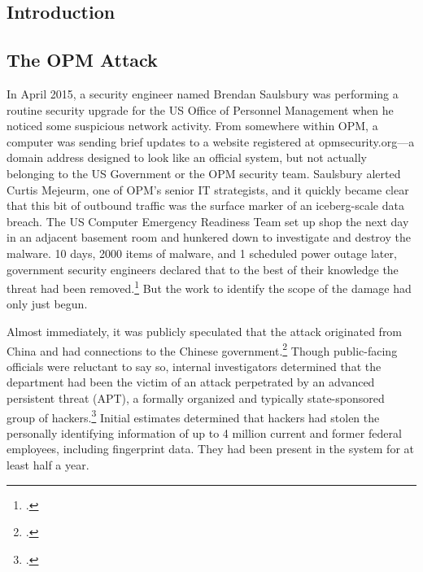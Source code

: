\documentclass{report}
\begin{document}
\begin{refsegment}

\section{Introduction}
\subsection{The OPM Attack}
In April 2015, a security engineer named Brendan Saulsbury was performing a routine security upgrade for the US Office of Personnel Management when he noticed some suspicious network activity. From somewhere within OPM, a computer was sending brief updates to a website registered at opmsecurity.org---a domain address designed to look like an official system, but not actually belonging to the US Government or the OPM security team. Saulsbury alerted Curtis Mejeurm, one of OPM's senior IT strategists, and it quickly became clear that this bit of outbound traffic was the surface marker of an iceberg-scale data breach. The US Computer Emergency Readiness Team set up shop the next day in an adjacent basement room and hunkered down to investigate and destroy the malware. 10 days, 2000 items of malware, and 1 scheduled power outage later, government security engineers declared that to the best of their knowledge the threat had been removed.\footcite{koerner_inside_2016} But the work to identify the scope of the damage had only just begun.

Almost immediately, it was publicly speculated that the attack originated from China and had connections to the Chinese government.\footcite{spetalnick_china_2015} Though public-facing officials were reluctant to say so, internal investigators determined that the department had been the victim of an attack perpetrated by an advanced persistent threat (APT), a formally organized and typically state-sponsored group of hackers.\footcite[Attributing a cyberattack is difficult because hackers have endless means to obscure their orgins. In this case, however, the first clue that investigators found was left there on purpose. A particularly effective group of hackers tied to China has made it a calling card of sorts to register sites using the names of members of Marvel's comic book superhero group, The Avengers. In this case, opmsecurity.org was registered under the name "Steve Rogers," better known as Captain America.]{koerner_inside_2016} Initial estimates determined that hackers had stolen the personally identifying information of up to 4 million current and former federal employees, including fingerprint data. They had been present in the system for at least half a year.


\end{refsegment}
\end{document}
